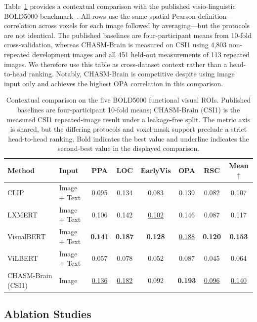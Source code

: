 Table~\ref{tab:bold5000_external} provides a contextual comparison with the
published visio-linguistic BOLD5000 benchmark~\cite{oota2022visiolinguistic}.
All rows use the same spatial Pearson definition---correlation across voxels
for each image followed by averaging---but the protocols are not identical.
The published baselines are four-participant means from 10-fold
cross-validation, whereas CHASM-Brain is measured on CSI1 using 4,803
non-repeated development images and all 451 held-out measurements of 113
repeated images.  We therefore use this table as cross-dataset context rather
than a head-to-head ranking.  Notably, CHASM-Brain is competitive despite using
image input only and achieves the highest OPA correlation in this comparison.

\begin{table}[t]
\centering
\caption{Contextual comparison on the five BOLD5000 functional visual ROIs.
Published baselines are four-participant 10-fold means; CHASM-Brain (CSI1)
is the measured CSI1 repeated-image result under a leakage-free split.  The
metric axis is shared, but the differing protocols and voxel-mask support
preclude a strict head-to-head ranking. Bold indicates the best value and
underline indicates the second-best value in the displayed comparison.}
\label{tab:bold5000_external}
\begin{tabular}{llcccccc}
\toprule
\textbf{Method} & \textbf{Input} & \textbf{PPA} & \textbf{LOC} & \textbf{EarlyVis} & \textbf{OPA} & \textbf{RSC} & \textbf{Mean} $\uparrow$ \\
\midrule
CLIP & Image + Text & 0.095 & 0.134 & 0.083 & 0.139 & 0.082 & 0.107 \\
LXMERT & Image + Text & 0.106 & 0.142 & \underline{0.102} & 0.146 & 0.087 & 0.117 \\
VisualBERT & Image + Text & \textbf{0.141} & \textbf{0.187} & \textbf{0.128} & \underline{0.188} & \textbf{0.120} & \textbf{0.153} \\
ViLBERT & Image + Text & 0.057 & 0.078 & 0.052 & 0.087 & 0.045 & 0.064 \\
\midrule
CHASM-Brain (CSI1) & Image & \underline{0.136} & \underline{0.182} & 0.092 & \textbf{0.193} & \underline{0.096} & \underline{0.140} \\
\bottomrule
\end{tabular}
\end{table}


\subsection{Ablation Studies}
\label{sec:ablation}

